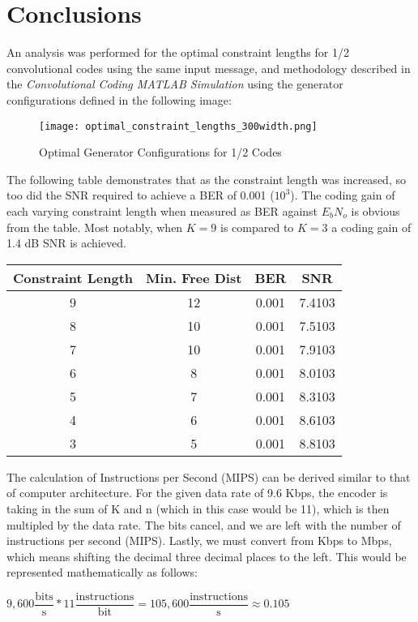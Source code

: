\documentclass[conference]{IEEEtran}
\begin{document}
\section{Conclusions}
An analysis was performed for the optimal constraint lengths for 1/2 convolutional codes using the same input message, and methodology described in the \textit{Convolutional Coding MATLAB Simulation} using the generator configurations defined in the following image:
\begin{figure}[h]
\centerline{\texttt{[image: optimal\_constraint\_lengths\_300width.png]}}
\caption{Optimal Generator Configurations for 1/2 Codes}
\label{fig:3}
\end{figure}
The following table demonstrates that as the constraint length was increased, so too did the SNR required to achieve a BER of 0.001 ($10^3$). The coding gain of each varying constraint length when measured as BER against $E_b N_o$ is obvious from the table. Most notably, when $K=9$ is compared to $K=3$ a coding gain of 1.4 dB SNR is achieved. 
\begin{center}
\begin{tabular}{| c | c | c | c |}
 \hline
 \textbf{Constraint Length} & \textbf{Min. Free Dist} & \textbf{BER} & \textbf{SNR} \\ 
 \hline
 9 & 12 & 0.001 & 7.4103 \\
 \hline
 8 & 10 & 0.001 & 7.5103 \\
 \hline
 7 & 10 & 0.001 & 7.9103 \\
 \hline
 6 & 8 & 0.001 & 8.0103 \\
 \hline
 5 & 7 & 0.001 & 8.3103 \\
 \hline
 4 & 6 & 0.001 & 8.6103 \\
 \hline
 3 & 5 & 0.001 & 8.8103 \\
 \hline
\end{tabular}
\end{center}

The calculation of Instructions per Second (MIPS) can be derived similar to that of computer architecture. For the given data rate of 9.6 Kbps, the encoder is taking in the sum of K and n (which in this case would be 11), which is then multipled by the data rate. The bits cancel, and we are left with the number of instructions per second (MIPS). Lastly, we must convert from Kbps to Mbps, which means shifting the decimal three decimal places to the left. This would be represented mathematically as follows:
\begin{center}
$9,600 \dfrac{\text{bits}}{\text{s}}*11\dfrac{\text{instructions}}{\text{bit}}=105,600 \dfrac{\text{instructions}}{\text{s}} \approx 0.105$
\end{center}
\end{document}
